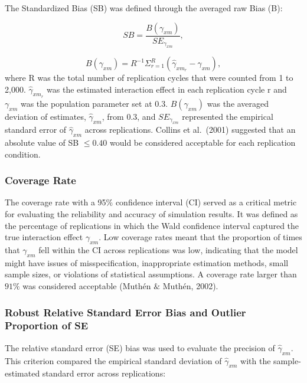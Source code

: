 \documentclass[
  man]{apa6}
\begin{document}
The Standardized Bias (SB) was defined through the averaged raw Bias (B):

\begin{equation}
SB = \frac{B(\gamma_{xm})}{SE_{\gamma_{xm}}},
\end{equation}

\begin{equation}
B(\gamma_{xm}) = R^{-1}\Sigma^{R}_{r = 1}(\hat{\gamma}_{xm_{r}} - \gamma_{xm}),
\end{equation}
where R was the total number of replication cycles that were counted from 1 to 2,000. \(\hat{\gamma}_{xm_{r}}\) was the estimated interaction effect in each replication cycle r and \(\gamma_{xm}\) was the population parameter set at 0.3. \(B(\gamma_{xm})\) was the averaged deviation of estimates, \(\hat{\gamma}_{xm}\), from 0.3, and \(SE_{\gamma_{xm}}\) represented the empirical standard error of \(\hat{\gamma}_{xm}\) across replications. Collins et al.~(2001) suggested that an absolute value of SB \(\le 0.40\) would be considered acceptable for each replication condition.

\hypertarget{coverage-rate}{%
\subsubsection{Coverage Rate}\label{coverage-rate}}

The coverage rate with a 95\(\%\) confidence interval (CI) served as a critical metric for evaluating the reliability and accuracy of simulation results. It was defined as the percentage of replications in which the Wald confidence interval captured the true interaction effect \(\gamma_{xm}\). Low coverage rates meant that the proportion of times that \(\gamma_{xm}\) fell within the CI across replications was low, indicating that the model might have issues of misspecification, inappropriate estimation methods, small sample sizes, or violations of statistical assumptions. A coverage rate larger than \(91\%\) was considered acceptable (Muthén \(\&\) Muthén, 2002).

\hypertarget{robust-relative-standard-error-bias-and-outlier-proportion-of-se}{%
\subsubsection{Robust Relative Standard Error Bias and Outlier Proportion of SE}\label{robust-relative-standard-error-bias-and-outlier-proportion-of-se}}

The relative standard error (SE) bias was used to evaluate the precision of \(\hat{\gamma}_{xm}\). This criterion compared the empirical standard deviation of \(\hat{\gamma}_{xm}\) with the sample-estimated standard error across replications:
\end{document}
